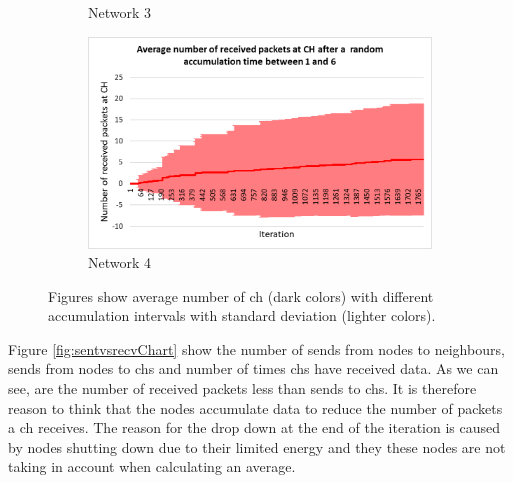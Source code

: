 \documentclass[USenglish]{uit-thesis}
\begin{document}
\begin{figure}
\begin{subfigure}[b]{0.475\textwidth}
            \caption[]%
            {{\small Network 3}}    
            \label{fig:recvfig3}
        \end{subfigure}
        \quad
        \begin{subfigure}[b]{0.475\textwidth}   
            \centering 
            \includegraphics[width=\textwidth]{RecvPkt_stdev_rand.png}
            \caption[]%
            {{\small Network 4}}    
            \label{fig:recvfig4}
        \end{subfigure}
        \caption[Figures show average number of \gls{ch} with different accumulation intervals with standard deviation.]
        {\small Figures show average number of \gls{ch} (dark colors) with different accumulation intervals with standard deviation (lighter colors).} 
        \label{fig:recPktChart}
    \end{figure}




Figure \ref{fig:sentvsrecvChart} show the number of sends from nodes to neighbours, sends from nodes to \glspl{ch} and number of times \glspl{ch} have received data. As we can see, are the number of received packets less than sends to \glspl{ch}. It is therefore reason to think that the nodes accumulate data to reduce the number of packets a \gls{ch} receives. The reason for the drop down at the end of the iteration is caused by nodes shutting down due to their limited energy and they these nodes are not taking in account when calculating an average.


\end{document}
